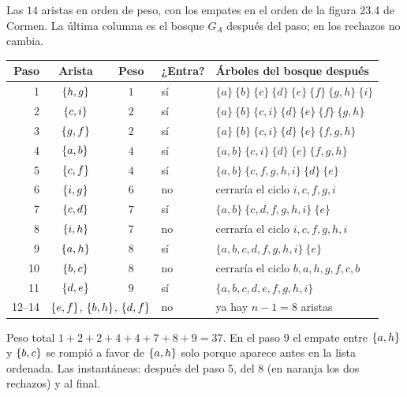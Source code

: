 \documentclass[11pt,letterpaper]{article}
\begin{document}
\begin{ejemplo}
  \label{ej:kruskal-cormen}
  Las $14$ aristas en orden de peso, con los empates en el orden de la
  figura 23.4 de Cormen. La última columna es el bosque $G_A$ después
  del paso; en los rechazos no cambia.
  \begin{center}
  \small
  \begin{tabular}{rcclp{7.2cm}}
    \toprule
    \textbf{Paso} & \textbf{Arista} & \textbf{Peso} & \textbf{¿Entra?}
      & \textbf{Árboles del bosque después} \\
    \midrule
    1 & $\left\{ h,g \right\}$ & $1$ & sí
      & $\{a\}\ \{b\}\ \{c\}\ \{d\}\ \{e\}\ \{f\}\ \{g,h\}\ \{i\}$ \\
    2 & $\left\{ c,i \right\}$ & $2$ & sí
      & $\{a\}\ \{b\}\ \{c,i\}\ \{d\}\ \{e\}\ \{f\}\ \{g,h\}$ \\
    3 & $\left\{ g,f \right\}$ & $2$ & sí
      & $\{a\}\ \{b\}\ \{c,i\}\ \{d\}\ \{e\}\ \{f,g,h\}$ \\
    4 & $\left\{ a,b \right\}$ & $4$ & sí
      & $\{a,b\}\ \{c,i\}\ \{d\}\ \{e\}\ \{f,g,h\}$ \\
    5 & $\left\{ c,f \right\}$ & $4$ & sí
      & $\{a,b\}\ \{c,f,g,h,i\}\ \{d\}\ \{e\}$ \\
    6 & $\left\{ i,g \right\}$ & $6$ & no & cerraría el ciclo $i, c, f, g, i$ \\
    7 & $\left\{ c,d \right\}$ & $7$ & sí & $\{a,b\}\ \{c,d,f,g,h,i\}\ \{e\}$ \\
    8 & $\left\{ i,h \right\}$ & $7$ & no & cerraría el ciclo $i, c, f, g, h, i$ \\
    9 & $\left\{ a,h \right\}$ & $8$ & sí & $\{a,b,c,d,f,g,h,i\}\ \{e\}$ \\
    10 & $\left\{ b,c \right\}$ & $8$ & no
      & cerraría el ciclo $b, a, h, g, f, c, b$ \\
    11 & $\left\{ d,e \right\}$ & $9$ & sí & $\{a,b,c,d,e,f,g,h,i\}$ \\
    12--14 & \multicolumn{2}{c}{$\left\{ e,f \right\}$, $\left\{ b,h \right\}$, $\left\{ d,f \right\}$}
      & no & ya hay $n - 1 = 8$ aristas \\
    \bottomrule
  \end{tabular}
  \end{center}
  Peso total $1 + 2 + 2 + 4 + 4 + 7 + 8 + 9 = 37$. En el paso 9 el
  empate entre $\left\{ a,h \right\}$ y $\left\{ b,c \right\}$ se rompió a favor de
  $\left\{ a,h \right\}$ solo porque aparece antes en la lista ordenada. Las
  instantáneas: después del paso 5, del 8 (en naranja los dos
  rechazos) y al final.
  \begin{center}
  \begin{tikzpicture}[x=0.78cm, y=0.78cm]

\end{tikzpicture}
\end{center}
\end{ejemplo}
\end{document}

